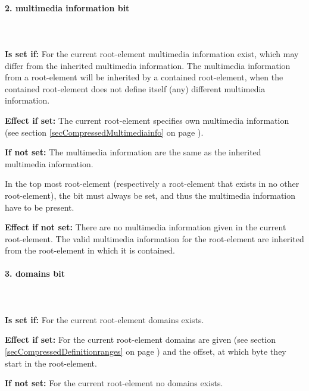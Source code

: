 \paragraph{2. multimedia information bit}

\ \\\\\noindent
\textbf{Is set if:} For the current root-element multimedia information exist, which may differ from the inherited multimedia information. The multimedia information from a root-element will be inherited by a contained root-element, when the contained root-element does not define itself (any) different multimedia information.

\bigskip\noindent
\textbf{Effect if set:}
The current root-element specifies own multimedia information (see section \ref{secCompressedMultimediainfo} on page \pageref{secCompressedMultimediainfo}).

\bigskip\noindent
\textbf{If not set:} The multimedia information are the same as the inherited multimedia information.

In the top most root-element (respectively a root-element that exists in no other root-element), the bit must always be set, and thus the multimedia information have to be present.

\bigskip\noindent
\textbf{Effect if not set:}
There are no multimedia information given in the current root-element. The valid multimedia information for the root-element are inherited from the root-element in which it is contained.


\paragraph{3. domains bit}

\ \\\\\noindent
\textbf{Is set if:} For the current root-element domains exists.

\bigskip\noindent
\textbf{Effect if set:}
For the current root-element domains are given (see section \ref{secCompressedDefinitionranges} on page \pageref{secCompressedDefinitionranges}) and the offset, at which byte they start in the root-element.

\bigskip\noindent
\textbf{If not set:} For the current root-element no domains exists.

